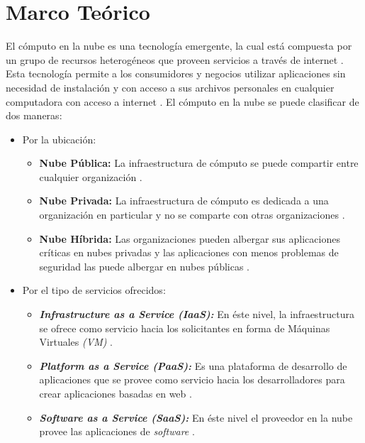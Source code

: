 \documentclass[jou,apacite]{apa6}
\begin{document}
\section{Marco Teórico}

El c\'omputo en la nube es una tecnolog\'ia emergente, la cual est\'a compuesta por un grupo de recursos heterog\'eneos que proveen servicios a trav\'es de internet \cite{agarwal2014efficient}.
Esta tecnolog\'ia permite a los consumidores y negocios utilizar aplicaciones sin necesidad de instalaci\'on y con acceso a sus archivos personales en cualquier computadora con acceso a internet \cite{ahmed2012advanced}. 
El c\'omputo en la nube se puede clasificar de dos maneras:
\begin{itemize}
	\item Por la ubicaci\'on: 
	\begin{itemize}
		\item \textbf{Nube P\'ublica:} La infraestructura de c\'omputo se puede compartir entre cualquier organizaci\'on \cite{ahmed2012advanced}.
		\item \textbf{Nube Privada:} La infraestructura de c\'omputo es dedicada a una organizaci\'on en particular y no se comparte con otras organizaciones \cite{ahmed2012advanced}.
		\item \textbf{Nube H\'ibrida:} Las organizaciones pueden albergar sus aplicaciones cr\'iticas en nubes privadas y las aplicaciones con menos problemas de seguridad las puede albergar en nubes p\'ublicas \cite{ahmed2012advanced}.
	\end{itemize}
	\item Por el tipo de servicios ofrecidos: 
	\begin{itemize}
		\item \textit{\textbf{Infrastructure as a Service (IaaS):}} En \'este nivel, la infraestructura se ofrece como servicio hacia los solicitantes en forma de M\'aquinas Virtuales \textit{(VM)} \cite{agarwal2014efficient}.
		\item \textit{\textbf{Platform as a Service (PaaS):}} Es una plataforma de desarrollo de aplicaciones que se provee como servicio hacia los desarrolladores para crear aplicaciones basadas en web \cite{agarwal2014efficient}.
		\item \textit{\textbf{Software as a Service (SaaS):}} En \'este nivel el proveedor en la nube provee las aplicaciones de \textit{software} \cite{agarwal2014efficient}.
	\end{itemize}
\end{itemize}
\end{document}
